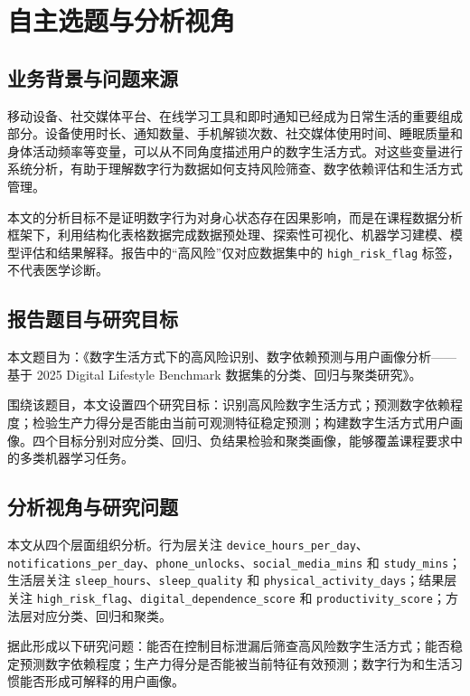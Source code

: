 \chapter{自主选题与分析视角}

\section{业务背景与问题来源}

移动设备、社交媒体平台、在线学习工具和即时通知已经成为日常生活的重要组成部分。设备使用时长、通知数量、手机解锁次数、社交媒体使用时间、睡眠质量和身体活动频率等变量，可以从不同角度描述用户的数字生活方式。对这些变量进行系统分析，有助于理解数字行为数据如何支持风险筛查、数字依赖评估和生活方式管理。

本文的分析目标不是证明数字行为对身心状态存在因果影响，而是在课程数据分析框架下，利用结构化表格数据完成数据预处理、探索性可视化、机器学习建模、模型评估和结果解释。报告中的“高风险”仅对应数据集中的 \texttt{high\_risk\_flag} 标签，不代表医学诊断。

\section{报告题目与研究目标}

本文题目为：《数字生活方式下的高风险识别、数字依赖预测与用户画像分析——基于 2025 Digital Lifestyle Benchmark 数据集的分类、回归与聚类研究》。

围绕该题目，本文设置四个研究目标：识别高风险数字生活方式；预测数字依赖程度；检验生产力得分是否能由当前可观测特征稳定预测；构建数字生活方式用户画像。四个目标分别对应分类、回归、负结果检验和聚类画像，能够覆盖课程要求中的多类机器学习任务。

\section{分析视角与研究问题}

本文从四个层面组织分析。行为层关注 \texttt{device\_hours\_per\_day}、\texttt{notifications\_per\_day}、\texttt{phone\_unlocks}、\texttt{social\_media\_mins} 和 \texttt{study\_mins}；生活层关注 \texttt{sleep\_hours}、\texttt{sleep\_quality} 和 \texttt{physical\_activity\_days}；结果层关注 \texttt{high\_risk\_flag}、\texttt{digital\_dependence\_score} 和 \texttt{productivity\_score}；方法层对应分类、回归和聚类。

据此形成以下研究问题：能否在控制目标泄漏后筛查高风险数字生活方式；能否稳定预测数字依赖程度；生产力得分是否能被当前特征有效预测；数字行为和生活习惯能否形成可解释的用户画像。

